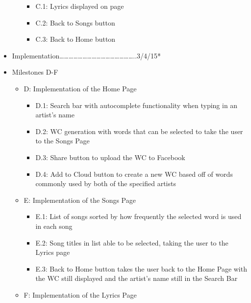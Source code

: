 \documentclass[]{article}
\begin{document}
\begin{itemize}
\begin{itemize}
    \begin{itemize}
    \itemsep1pt\parskip0pt
    \item
      C.1: Lyrics displayed on page
    \item
      C.2: Back to Songs button
    \item
      C.3: Back to Home button
    \end{itemize}
  \end{itemize}
\item
  Implementation\ldots{}\ldots{}\ldots{}\ldots{}\ldots{}\ldots{}\ldots{}\ldots{}\ldots{}\ldots{}\ldots{}\ldots{}\ldots{}\ldots{}\ldots{}\ldots{}..3/4/15*
\item
  Milestones D-F

  \begin{itemize}
  \itemsep1pt\parskip0pt
  \item
    D: Implementation of the Home Page

    \begin{itemize}
    \itemsep1pt\parskip0pt
    \item
      D.1: Search bar with autocomplete functionality when typing in an
      artist's name
    \item
      D.2: WC generation with words that can be selected to take the
      user to the Songs Page
    \item
      D.3: Share button to upload the WC to Facebook
    \item
      D.4: Add to Cloud button to create a new WC based off of words
      commonly used by both of the specified artists
    \end{itemize}
  \item
    E: Implementation of the Songs Page

    \begin{itemize}
    \itemsep1pt\parskip0pt
    \item
      E.1: List of songs sorted by how frequently the selected word is
      used in each song
    \item
      E.2: Song titles in list able to be selected, taking the user to
      the Lyrics page
    \item
      E.3: Back to Home button takes the user back to the Home Page with
      the WC still displayed and the artist's name still in the Search
      Bar
    \end{itemize}
  \item
    F: Implementation of the Lyrics Page


\end{itemize}
\end{itemize}
\end{document}
